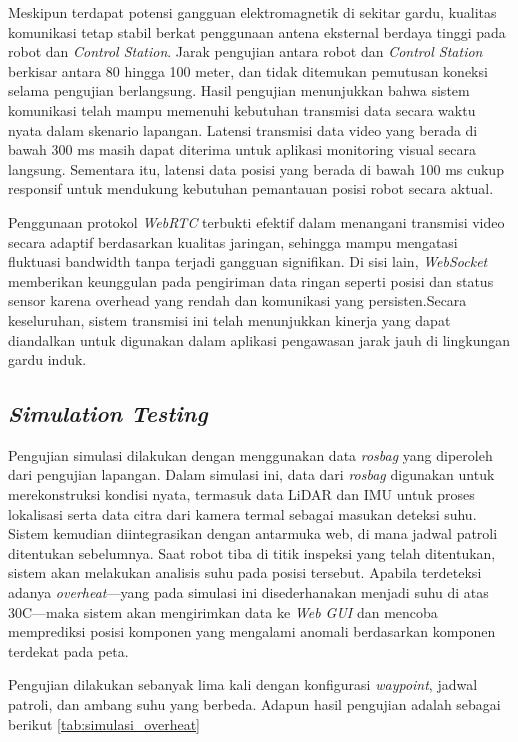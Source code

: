 Meskipun terdapat potensi gangguan elektromagnetik di sekitar gardu, kualitas komunikasi tetap stabil berkat penggunaan antena eksternal berdaya tinggi pada robot dan \emph{Control Station}. Jarak pengujian antara robot dan \emph{Control Station} berkisar antara 80 hingga 100 meter, dan tidak ditemukan pemutusan koneksi selama pengujian berlangsung. Hasil pengujian menunjukkan bahwa sistem komunikasi telah mampu memenuhi kebutuhan transmisi data secara waktu nyata dalam skenario lapangan. Latensi transmisi data video yang berada di bawah 300 ms masih dapat diterima untuk aplikasi monitoring visual secara langsung. Sementara itu, latensi data posisi yang berada di bawah 100 ms cukup responsif untuk mendukung kebutuhan pemantauan posisi robot secara aktual.

Penggunaan protokol \emph{WebRTC} terbukti efektif dalam menangani transmisi video secara adaptif berdasarkan kualitas jaringan, sehingga mampu mengatasi fluktuasi bandwidth tanpa terjadi gangguan signifikan. Di sisi lain, \emph{WebSocket} memberikan keunggulan pada pengiriman data ringan seperti posisi dan status sensor karena overhead yang rendah dan komunikasi yang persisten.Secara keseluruhan, sistem transmisi ini telah menunjukkan kinerja yang dapat diandalkan untuk digunakan dalam aplikasi pengawasan jarak jauh di lingkungan gardu induk.


\subsection{\emph{Simulation Testing}}

Pengujian simulasi dilakukan dengan menggunakan data \emph{rosbag} yang diperoleh dari pengujian lapangan. Dalam simulasi ini, data dari \emph{rosbag} digunakan untuk merekonstruksi kondisi nyata, termasuk data LiDAR dan IMU untuk proses lokalisasi serta data citra dari kamera termal sebagai masukan deteksi suhu. Sistem kemudian diintegrasikan dengan antarmuka web, di mana jadwal patroli ditentukan sebelumnya. Saat robot tiba di titik inspeksi yang telah ditentukan, sistem akan melakukan analisis suhu pada posisi tersebut. Apabila terdeteksi adanya \emph{overheat}—yang pada simulasi ini disederhanakan menjadi suhu di atas 30\textdegree C—maka sistem akan mengirimkan data ke \emph{Web GUI} dan mencoba memprediksi posisi komponen yang mengalami anomali berdasarkan komponen terdekat pada peta.

Pengujian dilakukan sebanyak lima kali dengan konfigurasi \emph{waypoint}, jadwal patroli, dan ambang suhu yang berbeda. Adapun hasil pengujian adalah sebagai berikut \ref{tab:simulasi_overheat}



